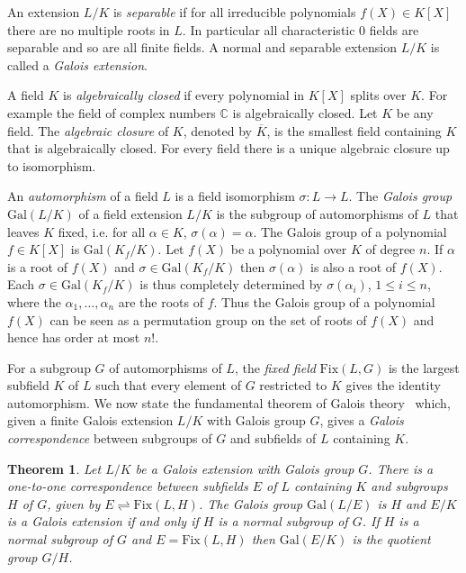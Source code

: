 \documentclass[11pt]{madras}%
\newtheorem{theorem}{Theorem}[chapter]
\theoremstyle{remark}
\newcommand{\Gal}[1]{{\ensuremath{\mathrm{Gal}\left(#1\right)}}}
\newcommand{\Fix}[2]{{\ensuremath{\mathrm{Fix}\left(#1,#2\right)}}}
\newcommand{\nomclfields}[3][]{{\nomenclature[r#1]{#2}{#3}}}
\begin{document}
An extension $L/K$ is \emph{separable} if for all irreducible polynomials $f(X) \in K[X]$ there
are no multiple roots in $L$. In particular all characteristic $0$
fields are separable and so are all finite fields. A normal and
separable extension $L/K$ is called a \emph{Galois
  extension}.

A field $K$ is \emph{algebraically closed} if every polynomial in
$K[X]$ splits over $K$. For example the field of complex numbers
$\mathbb{C}$ is algebraically closed. Let $K$ be any field. The
\emph{algebraic closure} of $K$, denoted by
$\overline{K}$, is the smallest field containing $K$ that is
algebraically closed.  For every field there is a unique algebraic
closure up to isomorphism.

An \emph{automorphism} of a
field $L$ is a field isomorphism $\sigma:L\rightarrow L$. The
\emph{Galois group} $\Gal{L/K}$ of a field
extension $L/K$ is the subgroup of automorphisms of $L$ that leaves
$K$ fixed, i.e. for all $\alpha \in K$, $\sigma(\alpha) = \alpha$. The
Galois group of a polynomial $f\in K[X]$ is $\Gal{K_f/K}$.  Let $f(X)$
be a polynomial over $K$ of degree $n$. If $\alpha$ is a root of
$f(X)$ and $\sigma \in \Gal{K_f/K}$ then $\sigma(\alpha)$ is also a
root of $f(X)$. Each $\sigma\in\Gal{K_f/K}$ is thus completely
determined by $\sigma(\alpha_i)$, $1 \leq i \leq n$, where the
$\alpha_1,\ldots,\alpha_n$ are the roots of $f$.  Thus the Galois
group of a polynomial $f(X)$ can be seen as a permutation group on the
set of roots of $f(X)$ and hence has order at most $n!$.


For a subgroup $G$ of automorphisms of $L$, the \emph{fixed field}
$\Fix{L}{G}$ is the largest subfield $K$ of $L$ such that every
element of $G$ restricted to $K$ gives the identity automorphism. We
now state the fundamental theorem of Galois theory~\cite[Theorem 1.1,
Chapter VI]{lang:algebra} which, given a finite Galois extension $L/K$
with Galois group $G$, gives a \emph{Galois correspondence} between
subgroups of $G$ and subfields of $L$ containing $K$.%
%
%
%
%
\nomclfields{\Fix{L}{G}}{fixed field of $L$ under $G$\refpage}

\begin{theorem}\label{thm-funda-galois} Let $L/K$ be a
  Galois extension with Galois group $G$. There is a one-to-one
  correspondence between subfields $E$ of $L$ containing $K$ and
  subgroups $H$ of $G$, given by $E \rightleftharpoons \Fix{L}{H}$.
  The Galois group $\Gal{L/E}$ is $H$ and $E/K$ is a Galois extension
  if and only if $H$ is a normal subgroup of $G$. If $H$ is a normal
  subgroup of $G$ and $E = \Fix{L}{H}$ then $\Gal{E/K}$ is the
  quotient group $G/H$.
\end{theorem}%
\end{document}

